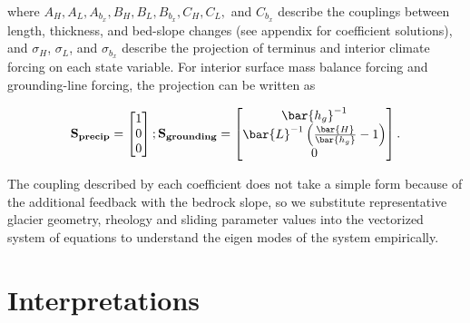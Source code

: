 \documentclass[tc, manuscript]{copernicus}
\begin{document}
where $A_H, A_L, A_{b_x}, B_H, B_L, B_{b_x}, C_H, C_L,$ and $C_{b_x}$ describe the couplings between length, thickness, and bed-slope changes (see appendix for coefficient solutions), and $\sigma_H$, $\sigma_L$, and $\sigma_{b_x}$ describe the projection of terminus and interior climate forcing on each state variable. For interior surface mass balance forcing and grounding-line forcing, the projection can be written as

\begin{align}
\bf{S}_{precip} =   \begin{bmatrix} 1 \\ 0 \\ 0 \end{bmatrix}; \space
\bf{S}_{grounding} =   \begin{bmatrix} \bar{h_g}^{-1} \\ \bar{L}^{-1}\left(\frac{\bar{H}}{\bar{h_g}}-1\right) \\ 0 \end{bmatrix}.
\end{align}


The coupling described by each coefficient does not take a simple form because of the additional feedback with the bedrock slope, so we substitute representative glacier geometry, rheology and sliding parameter values into the vectorized system of equations to understand the eigen modes of the system empirically. 


\section{Interpretations}
\end{document}
